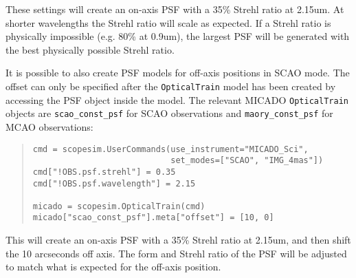 These settings will create an on-axis PSF with a 35\% Strehl ratio at 2.15um.
At shorter wavelengths the Strehl ratio will scale as expected.
If a Strehl ratio is physically impossible (e.g. 80\% at 0.9um), the largest PSF will be generated with the best physically possible Strehl ratio.

It is possible to also create PSF models for off-axis positions in SCAO mode.
The offset can only be specified after the \texttt{OpticalTrain} model has been created by accessing the PSF object inside the model.
The relevant MICADO \texttt{OpticalTrain} objects are \texttt{scao\_const\_psf} for SCAO observations and \texttt{maory\_const\_psf} for MCAO observations:

\begin{quote}
\begin{alltt}
\begin{lstlisting}[frame=single]
cmd = scopesim.UserCommands(use_instrument="MICADO_Sci", 
                            set_modes=["SCAO", "IMG_4mas"])
cmd["!OBS.psf.strehl"] = 0.35
cmd["!OBS.psf.wavelength"] = 2.15

micado = scopesim.OpticalTrain(cmd)
micado["scao_const_psf"].meta["offset"] = [10, 0]
\end{lstlisting}
\end{alltt}
\end{quote}

This will create an on-axis PSF with a 35\% Strehl ratio at 2.15um, and then shift the 10 arcseconds off axis.
The form and Strehl ratio of the PSF will be adjusted to match what is expected for the off-axis position.


